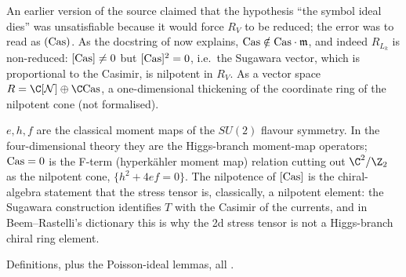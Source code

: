 \begin{warning}[title={A retracted objection, recorded in the source}]
An earlier version of the source claimed that the hypothesis ``the symbol ideal dies'' was unsatisfiable because it would
force $R_V$ to be reduced; the error was to read  as $(\mathrm{Cas})$. As the docstring of
 now explains, $\mathrm{Cas}\notin\mathrm{Cas}\cdot\mathfrak m$, and indeed $R_{L_k}$ is
non-reduced: $[\mathrm{Cas}]\ne0$ but $[\mathrm{Cas}]^2 = 0$, i.e.\ the Sugawara vector, which is proportional to the
Casimir, is nilpotent in $R_V$. As a vector space $\lsixteenR = \C[\lsixteenNil]\oplus\C\lsixteenCas$, a one-dimensional
thickening of the coordinate ring of the nilpotent cone (not formalised).
\end{warning}

\begin{physics}
$e,h,f$ are the classical moment maps of the $SU(2)$ flavour symmetry. In the four-dimensional theory they are the
Higgs-branch moment-map operators; $\mathrm{Cas} = 0$ is the F-term (hyperk\"ahler moment map) relation cutting out
$\C^2/\Z_2$ as the nilpotent cone, $\{h^2+4ef = 0\}$. The nilpotence of $[\mathrm{Cas}]$ is the chiral-algebra statement
that the stress tensor is, classically, a nilpotent element: the Sugawara construction identifies $T$ with the Casimir of
the currents, and in Beem--Rastelli's dictionary this is why the 2d stress tensor is not a Higgs-branch chiral ring
element.
\end{physics}

\begin{status}
Definitions, plus the Poisson-ideal lemmas, all \lean{[propext, Classical.}\allowbreak{}\allowbreak\lean{sound]}.
\end{status}

